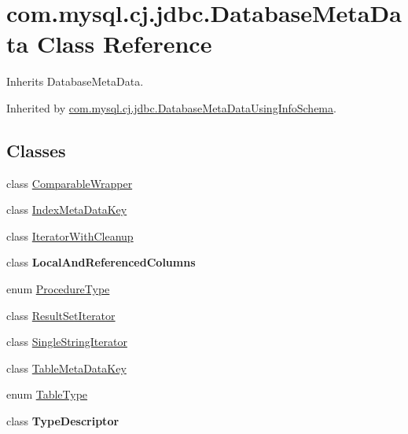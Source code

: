 \hypertarget{classcom_1_1mysql_1_1cj_1_1jdbc_1_1_database_meta_data}{}\section{com.\+mysql.\+cj.\+jdbc.\+Database\+Meta\+Data Class Reference}
\label{classcom_1_1mysql_1_1cj_1_1jdbc_1_1_database_meta_data}


Inherits Database\+Meta\+Data.



Inherited by \mbox{\hyperlink{classcom_1_1mysql_1_1cj_1_1jdbc_1_1_database_meta_data_using_info_schema}{com.\+mysql.\+cj.\+jdbc.\+Database\+Meta\+Data\+Using\+Info\+Schema}}.

\subsection*{Classes}
\begin{DoxyCompactItemize}
\item 
class \mbox{\hyperlink{classcom_1_1mysql_1_1cj_1_1jdbc_1_1_database_meta_data_1_1_comparable_wrapper}{Comparable\+Wrapper}}
\item 
class \mbox{\hyperlink{classcom_1_1mysql_1_1cj_1_1jdbc_1_1_database_meta_data_1_1_index_meta_data_key}{Index\+Meta\+Data\+Key}}
\item 
class \mbox{\hyperlink{classcom_1_1mysql_1_1cj_1_1jdbc_1_1_database_meta_data_1_1_iterator_with_cleanup}{Iterator\+With\+Cleanup}}
\item 
class {\bfseries Local\+And\+Referenced\+Columns}
\item 
enum \mbox{\hyperlink{enumcom_1_1mysql_1_1cj_1_1jdbc_1_1_database_meta_data_1_1_procedure_type}{Procedure\+Type}}
\item 
class \mbox{\hyperlink{classcom_1_1mysql_1_1cj_1_1jdbc_1_1_database_meta_data_1_1_result_set_iterator}{Result\+Set\+Iterator}}
\item 
class \mbox{\hyperlink{classcom_1_1mysql_1_1cj_1_1jdbc_1_1_database_meta_data_1_1_single_string_iterator}{Single\+String\+Iterator}}
\item 
class \mbox{\hyperlink{classcom_1_1mysql_1_1cj_1_1jdbc_1_1_database_meta_data_1_1_table_meta_data_key}{Table\+Meta\+Data\+Key}}
\item 
enum \mbox{\hyperlink{enumcom_1_1mysql_1_1cj_1_1jdbc_1_1_database_meta_data_1_1_table_type}{Table\+Type}}
\item 
class {\bfseries Type\+Descriptor}
\end{DoxyCompactItemize}
